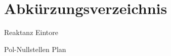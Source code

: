 \section{Abkürzungsverzeichnis}
\begin{description}
[style=multiline,topsep=0pt,leftmargin=3cm,rightmargin=0cm]
  \item[RET] Reaktanz Eintore
  \item[P-N-Plan] Pol-Nullstellen Plan
\end{description}